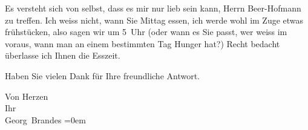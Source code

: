 \pstart
           Es versteht sich von selbst, dass es mir nur lieb sein kann, Herrn Beer-Hofmann zu treffen. Ich weiss nicht, wann
               Sie Mittag essen, ich werde wohl im Zuge etwas frühstücken, also sagen wir um
                  5 Uhr{ }{\pb}(oder wann es Sie passt, wer
               weiss im voraus, wann man an einem bestimmten Tag Hunger hat?) Recht bedacht
               überlasse ich Ihnen die Esszeit.\pend
           
\pstart
           Haben Sie vielen Dank für Ihre freundliche Antwort.\pend
           
\pstart
           Von Herzen{\\[\baselineskip]}Ihr{\\[\baselineskip]}\spacefill\mbox{Georg Brandes}\pend
           \leftskip=0em{}\endnumbering{}  \newcommand{\dateiname}{L01118}\newcommand{\titel}{Georg Brandes an Arthur Schnitzler, 13. 5. [1901]}\newcommand{\editorInnen}{Martin Anton Müller und Gerd-Hermann Susen}
